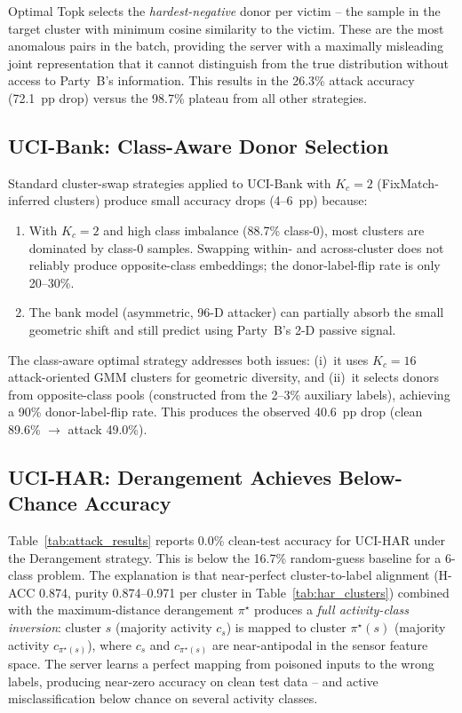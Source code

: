 \documentclass{article}
\begin{document}
Optimal Topk selects the \emph{hardest-negative} donor per victim --
the sample in the target cluster with minimum cosine similarity to the victim.
These are the most anomalous pairs in the batch, providing the server with
a maximally misleading joint representation that it cannot distinguish from
the true distribution without access to Party~B's information.
This results in the 26.3\% attack accuracy (72.1~pp drop) versus the
98.7\% plateau from all other strategies.

\subsection{UCI-Bank: Class-Aware Donor Selection}

Standard cluster-swap strategies applied to UCI-Bank with $K_c\!=\!2$
(FixMatch-inferred clusters) produce small accuracy drops (4--6~pp) because:
\begin{enumerate}
  \item With $K_c\!=\!2$ and high class imbalance (88.7\% class-0),
    most clusters are dominated by class-0 samples.
    Swapping within- and across-cluster does not reliably produce opposite-class
    embeddings; the donor-label-flip rate is only 20--30\%.
  \item The bank model (asymmetric, 96-D attacker) can partially absorb the
    small geometric shift and still predict using Party~B's 2-D passive signal.
\end{enumerate}

The class-aware optimal strategy addresses both issues:
(i)~it uses $K_c\!=\!16$ attack-oriented GMM clusters for geometric diversity,
and (ii)~it selects donors from opposite-class pools (constructed from the
2--3\% auxiliary labels), achieving a 90\% donor-label-flip rate.
This produces the observed 40.6~pp drop (clean 89.6\% $\to$ attack 49.0\%).

\subsection{UCI-HAR: Derangement Achieves Below-Chance Accuracy}

Table~\ref{tab:attack_results} reports 0.0\% clean-test accuracy for UCI-HAR
under the Derangement strategy.
This is below the 16.7\% random-guess baseline for a 6-class problem.
The explanation is that near-perfect cluster-to-label alignment
(H-ACC 0.874, purity 0.874--0.971 per cluster in Table~\ref{tab:har_clusters})
combined with the maximum-distance derangement $\pi^\star$ produces a
\emph{full activity-class inversion}: cluster $s$ (majority activity $c_s$)
is mapped to cluster $\pi^\star(s)$ (majority activity $c_{\pi^\star(s)}$),
where $c_s$ and $c_{\pi^\star(s)}$ are near-antipodal in the sensor feature space.
The server learns a perfect mapping from poisoned inputs to the wrong labels,
producing near-zero accuracy on clean test data -- and active misclassification
below chance on several activity classes.
\end{document}
